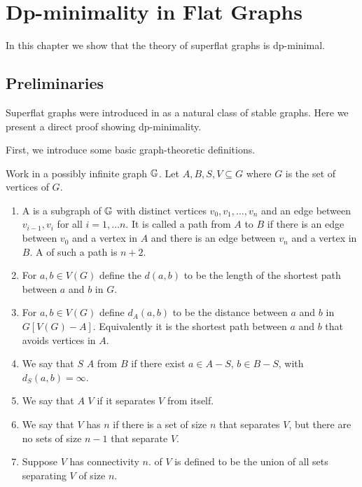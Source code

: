 \chapter{Dp-minimality in Flat Graphs}

In this chapter we show that the theory of superflat graphs is dp-minimal.

\section{Preliminaries}

Superflat graphs were introduced in \cite{stable_graphs} as a natural class of stable graphs. Here we present a direct proof showing dp-minimality.

First, we introduce some basic graph-theoretic definitions.
\begin{Definition}
  Work in a possibly infinite graph $\mathbb G$. Let $A, B, S, V \subseteq G$ where $G$ is the set of vertices of $G$.
  \begin{enumerate}
  \item A  is a subgraph of $\mathbb G$ with distinct vertices $v_0, v_1, \ldots, v_n$ and an edge between $v_{i-1}, v_i$ for all $i = 1, \ldots n$.
    It is called a path from $A$ to $B$ if there is an edge between $v_0$ and a vertex in $A$ and there is an edge between $v_n$ and a vertex in $B$.
    A  of such a path is $n+2$.
  \item For $a,b \in V(G)$ define the  $d(a,b)$ to be the length of the shortest path between $a$ and $b$ in $G$.
  \item For $a,b \in V(G)$ define $d_A(a,b)$ to be the distance between $a$ and $b$ in $G[V(G) - A]$. Equivalently it is the shortest path between $a$ and $b$ that avoids vertices in $A$.
  \item We say that $S$  $A$ from $B$ if there exist $a \in A - S$, $b \in B - S$, with $d_S(a,b) = \infty$.
  \item We say that $A$  $V$ if it separates $V$ from itself.
  \item We say that $V$ has  $n$ if there is a set of size $n$ that separates $V$,
    but there are no sets of size $n-1$ that separate $V$.
  \item Suppose $V$ has connectivity $n$.  of $V$ is defined to be the union of all sets separating $V$ of size $n$.
  \end{enumerate}
\end{Definition}

